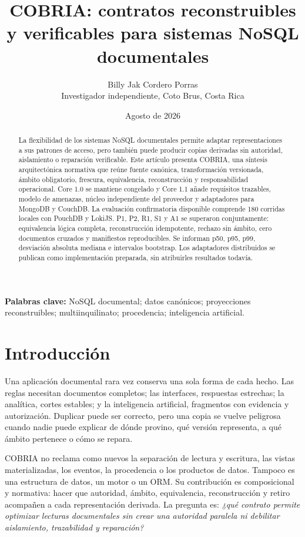 \documentclass[11pt]{article}
\title{COBRIA: contratos reconstruibles y verificables para sistemas NoSQL documentales}
\author{Billy Jak Cordero Porras\\Investigador independiente, Coto Brus, Costa Rica}
\date{Agosto de 2026}
\begin{document}
\maketitle
\begin{abstract}
La flexibilidad de los sistemas NoSQL documentales permite adaptar representaciones a sus patrones de acceso, pero también puede producir copias derivadas sin autoridad, aislamiento o reparación verificable. Este artículo presenta COBRIA, una síntesis arquitectónica normativa que reúne fuente canónica, transformación versionada, ámbito obligatorio, frescura, equivalencia, reconstrucción y responsabilidad operacional. Core 1.0 se mantiene congelado y Core 1.1 añade requisitos trazables, modelo de amenazas, núcleo independiente del proveedor y adaptadores para MongoDB y CouchDB. La evaluación confirmatoria disponible comprende 180 corridas locales con PouchDB y LokiJS. P1, P2, R1, S1 y A1 se superaron conjuntamente: equivalencia lógica completa, reconstrucción idempotente, rechazo sin ámbito, cero documentos cruzados y manifiestos reproducibles. Se informan p50, p95, p99, desviación absoluta mediana e intervalos bootstrap. Los adaptadores distribuidos se publican como implementación preparada, sin atribuirles resultados todavía.
\end{abstract}
\textbf{Palabras clave:} NoSQL documental; datos canónicos; proyecciones reconstruibles; multiinquilinato; procedencia; inteligencia artificial.

\section{Introducción}
Una aplicación documental rara vez conserva una sola forma de cada hecho. Las reglas necesitan documentos completos; las interfaces, respuestas estrechas; la analítica, cortes estables; y la inteligencia artificial, fragmentos con evidencia y autorización. Duplicar puede ser correcto, pero una copia se vuelve peligrosa cuando nadie puede explicar de dónde provino, qué versión representa, a qué ámbito pertenece o cómo se repara.

COBRIA no reclama como nuevos la separación de lectura y escritura, las vistas materializadas, los eventos, la procedencia o los productos de datos. Tampoco es una estructura de datos, un motor o un ORM. Su contribución es composicional y normativa: hacer que autoridad, ámbito, equivalencia, reconstrucción y retiro acompañen a cada representación derivada. La pregunta es: \emph{¿qué contrato permite optimizar lecturas documentales sin crear una autoridad paralela ni debilitar aislamiento, trazabilidad y reparación?}
\end{document}
